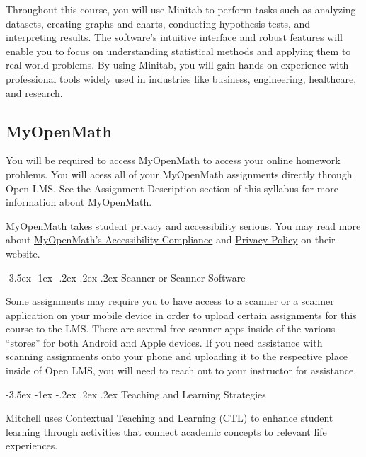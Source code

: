 \documentclass[11pt]{article}
\makeatletter
\renewcommand\section{\@startsection{section}{1}{0pt}%
  {-3.5ex \@plus -1ex \@minus -.2ex}%
  {.2ex \@plus.2ex}%
  {\normalfont\Large\bfseries}} %
\makeatother
\begin{document}
Throughout this course, you will use Minitab to perform tasks such as analyzing datasets, creating graphs and charts, conducting hypothesis tests, and interpreting results. The software's intuitive interface and robust features will enable you to focus on understanding statistical methods and applying them to real-world problems. By using Minitab, you will gain hands-on experience with professional tools widely used in industries like business, engineering, healthcare, and research.

\subsection{MyOpenMath}

You will be required to access MyOpenMath to access your online homework problems. You will acess all of your MyOpenMath assignments directly through Open LMS. See the Assignment Description section of this syllabus for more information about MyOpenMath.

MyOpenMath takes student privacy and accessibility serious. You may read more about \href{https://asccc.org/sites/default/files/MyOpenMath\%20\_\%20WAMAP\%20\_\%20IMathAS\%20Accessibility.pdf}{MyOpenMath's Accessibility Compliance} and \href{https://www.myopenmath.com/info/policies/privacy.php}{Privacy Policy} on their website.

\section{Scanner or Scanner Software}

Some assignments may require you to have access to a scanner or a scanner application on your mobile device in order to upload certain assignments for this course to the LMS. There are several free scanner apps inside of the various ``stores'' for both Android and Apple devices. If you need assistance with scanning assignments onto your phone and uploading it to the respective place inside of Open LMS, you will need to reach out to your instructor for assistance.

\section{Teaching and Learning Strategies}

Mitchell uses Contextual Teaching and Learning (CTL) to enhance student learning through activities that connect academic concepts to relevant life experiences.
\end{document}
